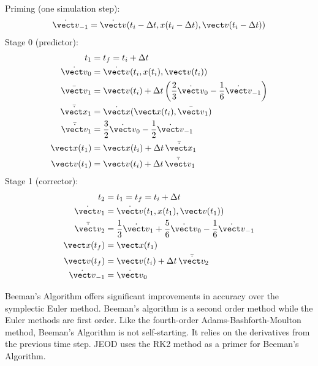 Priming (one simulation step):
\begin{equation}
\label{eqn:beeman_prime}
\begin{split}
\dot{\vect v}_{-1} &=
  \dot{\vect v}(t_i-\Delta t, x(t_i-\Delta t),\vect v(t_i-\Delta t)) \\
\end{split}
\end{equation}
Stage 0 (predictor):
\begin{equation}
\label{eqn:beeman_0}
\begin{split}
t_1 &= t_f = t_i + \Delta t \\
\dot{\vect v}_{0} &=
  \dot{\vect v}(t_i, x(t_i),\vect v(t_i)) \\
\bar{\vect v}_1 &= \vect v(t_i) +
   \Delta t
   \left(\frac 2 3 \dot{\vect v}_{0} - \frac 1 6 \dot{\vect v}_{-1}\right) \\
\bar{\dot{\vect x}}_1 &= \dot {\vect x}(\vect x(t_i),\bar{\vect v}_1) \\
\bar{\dot{\vect v}}_1 &=
  \frac 3 2 \dot{\vect v}_{0} - \frac 1 2 \dot{\vect v}_{-1} \\
\vect x(t_1) &= \vect x(t_i) + \Delta t \, \bar{\dot{\vect x}}_1 \\
\vect v(t_1) &= \vect v(t_i) + \Delta t \, \bar{\dot{\vect v}}_1
\end{split}
\end{equation}
Stage 1 (corrector):
\begin{equation}
\label{eqn:beeman_1}
\begin{split}
t_2 &= t_1 = t_f = t_i + \Delta t \\
\dot{\vect v}_{1} &=
  \dot{\vect v}(t_1, x(t_1),\vect v(t_1)) \\
\bar{\dot{\vect v}}_2 &=
  \frac 1 3 \dot{\vect v}_{1} +
  \frac 5 6 \dot{\vect v}_{0} - \frac 1 6 \dot{\vect v}_{-1} \\
\vect x(t_f) &= \vect x(t_1) \\
\vect v(t_f) &= \vect v(t_i) + \Delta t \, \bar{\dot{\vect v}}_2 \\
\dot{\vect v}_{-1} &= \dot{\vect v}_{0}
\end{split}
\end{equation}


Beeman's Algorithm offers significant improvements in accuracy over
the symplectic Euler method. Beeman's algorithm is a second order method
while the Euler methods are first order. Like the fourth-order
Adams-Bashforth-Moulton method, Beeman's Algorithm
is not self-starting. It relies on the derivatives from the previous
time step. JEOD uses the RK2 method as a primer for Beeman's Algorithm.


